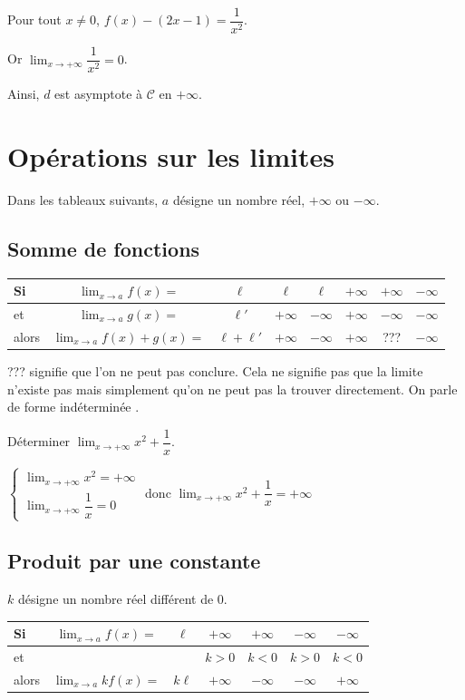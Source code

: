 \documentclass[french]{book}
\newcommand{\ds}{\displaystyle}
\newcommand{\limite}[2][x]{\ds\lim_{#1\rightarrow #2}}
\newcommand{\limpinf}[1][x]{\ds\lim_{#1\rightarrow +\infty}}
\newcommand{\calc}{\mathscr{C}}
\renewcommand{\arraystretch}{1.2}
\begin{document}
Pour tout $x \neq 0$, $f(x)-(2x-1)=\dfrac{1}{x^{2}}$.

Or $\limpinf \dfrac{1}{x^{2}}=0$.

Ainsi, $d$ est asymptote à $\calc$ en $+\infty$.

\newpage
\section{Op\'erations sur les limites}
Dans les tableaux suivants, $a$ d\'esigne un nombre r\'eel, $+\infty$ ou $-\infty$.
\subsection{Somme de fonctions}
\begin{center}
\renewcommand{\arraystretch}{2}
\begin{tabular}{|lc|c|c|c|c|c|c|} \hline
Si & $\limite[x]{a}f(x)=$ & $\ell$ & $\ell$ & $\ell$ & $+\infty$ & $+\infty$ & $-\infty$ \\ \hline
et & $\limite[x]{a}g(x)=$ & $\ell'$ & $+\infty$ & $-\infty$ & $+\infty$ & $-\infty$ & $-\infty$ \\ \hline
alors & $\limite[x]{a}f(x)+g(x)=$ & $\ell+\ell'$& $+\infty$ & $-\infty$ & $+\infty$ & ??? & $-\infty$ \\ \hline
\end{tabular}
\end{center}

\begin{rem}
??? signifie que l'on ne peut pas conclure. Cela ne signifie pas que la limite n'existe pas mais simplement qu'on ne peut pas la trouver directement. On parle de \og forme ind\'etermin\'ee \fg.
\end{rem}

\begin{exemple}
D\'eterminer $\limpinf x^{2}+\dfrac{1}{x}$.
\end{exemple}


$\left\lbrace
\begin{array}{l}
\limpinf x^{2}=+\infty \\
\limpinf \dfrac{1}{x}=0
\end{array}
\right.$
donc $\limpinf x^{2}+\dfrac{1}{x}=+\infty$


\subsection{Produit par une constante}
$k$ d\'esigne un nombre r\'eel diff\'erent de 0.
\begin{center}
\renewcommand{\arraystretch}{2}
\begin{tabular}{|lc|c|c|c|c|c|} \hline
Si & $\limite[x]{a}f(x)=$ & $\ell$ & $+\infty$ & $+\infty$ & $-\infty$ & $-\infty$ \\ \hline
et &  &  & $k>0$ & $k<0$ & $k>0$ & $k<0$ \\ \hline
alors & $\limite[x]{a}kf(x)=$ & $k\ell$ & $+\infty$ & $-\infty$ & $-\infty$ & $+\infty$ \\ \hline
\end{tabular}
\end{center}
\end{document}
